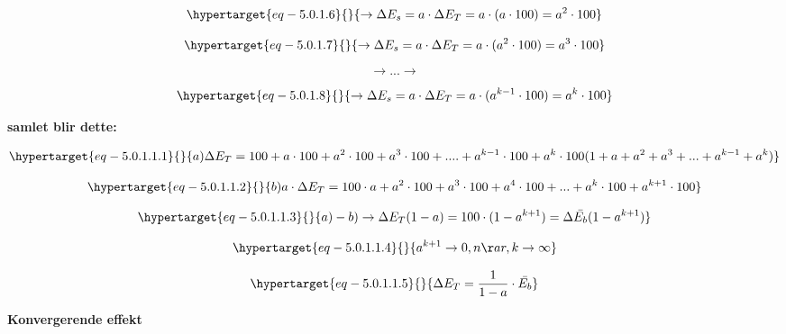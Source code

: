 \documentclass[
]{article}
\begin{document}
\begin{equation}\protect\hypertarget{eq-5.0.1.6}{}{
\rightarrow \Delta E_s = a \cdot \Delta E_T = a \cdot (a \cdot 100) = a^2 \cdot 100
}\label{eq-5.0.1.6}\end{equation}

\begin{equation}\protect\hypertarget{eq-5.0.1.7}{}{
\rightarrow \Delta E_s = a \cdot \Delta E_T = a \cdot (a^2 \cdot 100) = a^3 \cdot 100
}\label{eq-5.0.1.7}\end{equation}

\[
\rightarrow ... \rightarrow
\]

\begin{equation}\protect\hypertarget{eq-5.0.1.8}{}{
\rightarrow \Delta E_s = a \cdot \Delta E_T = a \cdot (a^{k-1} \cdot 100) = a^k \cdot 100
}\label{eq-5.0.1.8}\end{equation}

\textbf{samlet blir dette:}

\begin{equation}\protect\hypertarget{eq-5.0.1.1.1}{}{
a) \Delta E_T = 100 + a \cdot 100 + a^2 \cdot 100 + a^3 \cdot 100 + .... + a^{k-1} \cdot 100 + a^k \cdot 100 (1 + a + a^2 + a^3 + ... + a^{k-1} + a^k)
}\label{eq-5.0.1.1.1}\end{equation}

\begin{equation}\protect\hypertarget{eq-5.0.1.1.2}{}{
b) a \cdot \Delta E_T = 100 \cdot a + a^2 \cdot 100 + a^3 \cdot 100 + a^4 \cdot 100 + ... + a^{k} \cdot 100 + a^{k + 1} \cdot 100
}\label{eq-5.0.1.1.2}\end{equation}

\begin{equation}\protect\hypertarget{eq-5.0.1.1.3}{}{
a) - b) \rightarrow \Delta E_T (1-a) = 100 \cdot (1-a^{k+1}) = \Delta \bar{E_b} (1-a^{k+1})
}\label{eq-5.0.1.1.3}\end{equation}

\begin{equation}\protect\hypertarget{eq-5.0.1.1.4}{}{
a^{k+1} \rightarrow 0 ,når, k \rightarrow \infty
}\label{eq-5.0.1.1.4}\end{equation}

\begin{equation}\protect\hypertarget{eq-5.0.1.1.5}{}{
\Delta E_T = \frac{1}{1-a} \cdot \bar{E_b}
}\label{eq-5.0.1.1.5}\end{equation}

\textbf{Konvergerende effekt}
\end{document}
